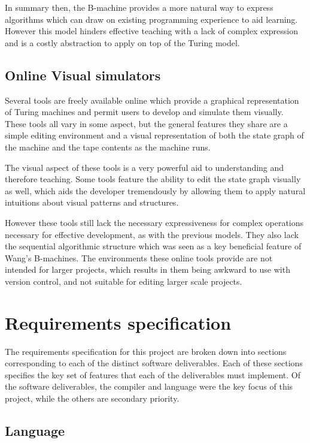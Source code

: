 \documentclass[11pt]{article}
\begin{document}
In summary then, the B-machine provides a more natural way to express algorithms which can draw on existing programming experience to aid learning. However this model hinders effective teaching with a lack of complex expression and is a costly abstraction to apply on top of the Turing model.

\subsection{Online Visual simulators}

Several tools are freely available online which provide a graphical representation of Turing machines and permit users to develop and simulate them visually. These tools all vary in some aspect, but the general features they share are a simple editing environment and a visual representation of both the state graph of the machine and the tape contents as the machine runs.

The visual aspect of these tools is a very powerful aid to understanding and therefore teaching. Some tools feature the ability to edit the state graph visually as well, which aids the developer tremendously by allowing them to apply natural intuitions about visual patterns and structures.

However these tools still lack the necessary expressiveness for complex operations necessary for effective development, as with the previous models. They also lack the sequential algorithmic structure which was seen as a key beneficial feature of Wang's B-machines. The environments these online tools provide are not intended for larger projects, which results in them being awkward to use with version control, and not suitable for editing larger scale projects.

\section{Requirements specification}

The requirements specification for this project are broken down into sections corresponding to each of the distinct software deliverables. Each of these sections specifies the key set of features that each of the deliverables must implement. Of the software deliverables, the compiler and language were the key focus of this project, while the others are secondary priority.

\subsection{Language}
\end{document}
